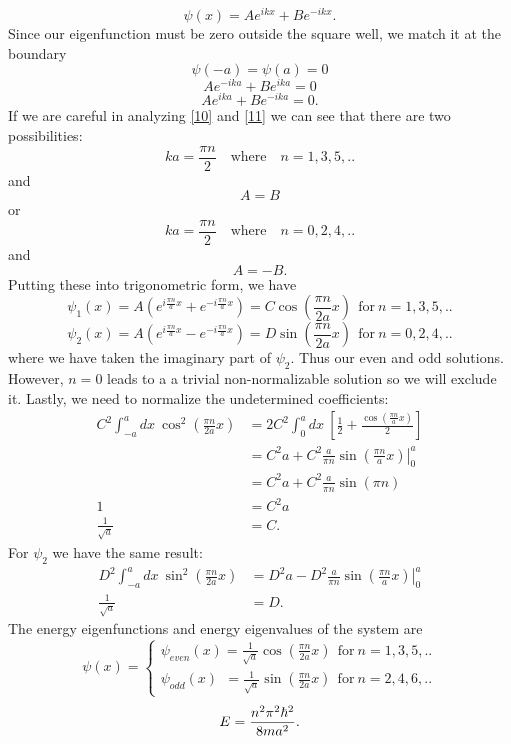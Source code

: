 \documentclass[11pt,letterpaper]{article}
\begin{document}
\begin{enumerate}
\begin{enumerate}
$$\psi(x) = Ae^{ikx}+Be^{-ikx}.$$
Since our eigenfunction must be zero outside the square well, we match it at the boundary
$$\psi(-a) = \psi(a) = 0$$
\begin{equation}\label{10}Ae^{-ika} + Be^{ika} =0\end{equation}
\begin{equation}\label{11} Ae^{ika} +Be^{-ika} = 0.\end{equation}
If we are careful in analyzing \eqref{10} and \eqref{11} we can see that there are two possibilities:
$$ka = \frac{\pi n}{2}\quad\text{where}\quad n = 1,3,5,..$$ and
$$A=B$$
or
$$ka = \frac{\pi n}{2}\quad\text{where}\quad n = 0,2,4,..$$
and
$$A=-B.$$
Putting these into trigonometric form, we have
$$\psi_1(x) = A(e^{i\frac{\pi n}{a}x}+e^{-i\frac{\pi n}{a}x}) = C\cos\left(\frac{\pi n}{2a}x\right)\ \ \text{for}\ n=1,3,5,..$$
$$\psi_2(x) = A(e^{i\frac{\pi n}{a}x}-e^{-i\frac{\pi n}{a}x}) = D\sin\left(\frac{\pi n}{2a}x\right)\ \ \text{for}\ n=0,2,4,..$$
where we have taken the imaginary part of $\psi_2$. Thus our even and odd solutions. However, $n=0$ leads to a a trivial non-normalizable solution so we will exclude it. Lastly, we need to normalize the undetermined coefficients:
\begin{align*}C^2\int_{-a}^a{dx\ \cos^2\left(\frac{\pi n}{2a}x\right) }&= 2C^2\int_{0}^a{dx\ \left[\frac{1}{2}+\frac{\cos\left(\frac{\pi n}{a}x\right)}{2}\right]}\\
&=C^2a+C^2\frac{a}{\pi n}\left.\sin\left(\frac{\pi n}{a}x\right)\right|_0^a\\
&=C^2a+C^2\frac{a}{\pi n}\sin(\pi n)\\
1&=C^2a\\
\frac{1}{\sqrt a} &= C.
\end{align*}
For $\psi_2$ we have the same result:
\begin{align*}D^2\int_{-a}^a{dx\ \sin^2\left(\frac{\pi n}{2a}x\right) }&= D^2a-D^2\frac{a}{\pi n}\left.\sin\left(\frac{\pi n}{a}x\right)\right|_0^a\\
\frac{1}{\sqrt a}&=D.
\end{align*}
The energy eigenfunctions and energy eigenvalues of the system are
$$\psi(x) = \begin{cases} \psi_{even}(x)=\frac{1}{\sqrt a}\cos\left(\frac{\pi n}{2a}x\right)\ \ \text{for}\ n = 1,3,5,..\\
\psi_{odd}(x)\;\,= \frac{1}{\sqrt a}\sin\left(\frac{\pi n}{2a}x\right)\ \ \text{for}\ n = 2,4,6,..\end{cases}$$
$$E = \frac{n^2\pi^2\hbar^2}{8ma^2}.$$

\end{enumerate}
\end{enumerate}
\end{document}
